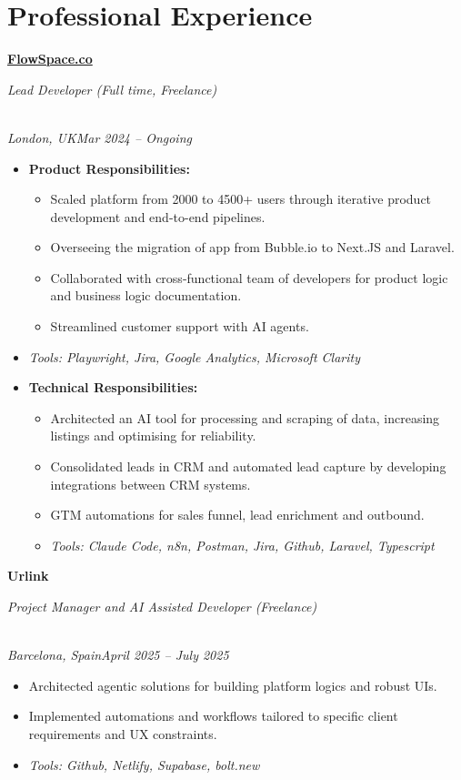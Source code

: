 \documentclass[a4paper,10pt]{article}
\newcommand{\role}[4]{\vspace{3pt}\noindent\hspace{0.6em}\parbox[t]{0.38\textwidth}{\raggedright\textbf{#1}}\hfill\parbox[t]{0.58\textwidth}{\raggedleft\textit{#2}}\\{\textit{#3}\hfill\textit{#4}}\vspace{1pt}}
\begin{document}
\section{Professional Experience}
\role{\href{https://flowspace.co}{FlowSpace.co}}{Lead Developer (Full time, Freelance)}{London, UK}{Mar 2024 -- Ongoing}
\begin{itemize}
\item \textbf{Product Responsibilities:}
\begin{itemize}[label=--]
\item Scaled platform from 2000 to 4500+ users through iterative product development and end-to-end pipelines.
\item Overseeing the migration of app from Bubble.io to Next.JS and Laravel.
\item Collaborated with cross-functional team of developers for product logic and business logic documentation.
\item Streamlined customer support with AI agents.
\end{itemize}
\item \textit{Tools: Playwright, Jira, Google Analytics, Microsoft Clarity}
\item \textbf{Technical Responsibilities:}
\begin{itemize}[label=--]
\item Architected an AI tool for processing and scraping of data, increasing listings and optimising for reliability.
\item Consolidated leads in CRM and automated lead capture by developing integrations between CRM systems.
\item GTM automations for sales funnel, lead enrichment and outbound.
\item \textit{Tools: Claude Code, n8n, Postman, Jira, Github, Laravel, Typescript}
\end{itemize}
\end{itemize}

\role{Urlink}{Project Manager and AI Assisted Developer (Freelance)}{Barcelona, Spain}{April 2025 -- July 2025}
\begin{itemize}
\item Architected agentic solutions for building platform logics and robust UIs.
\item Implemented automations and workflows tailored to specific client requirements and UX constraints.
\item \textit{Tools: Github, Netlify, Supabase, bolt.new}
\end{itemize}
\end{document}

